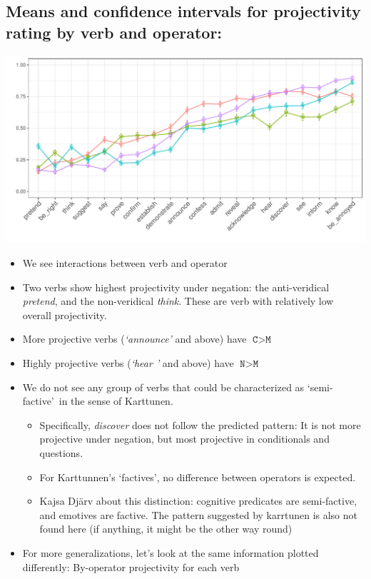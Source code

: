 \documentclass[10pt]{article}\usepackage[]{graphicx}\usepackage[dvipsnames]{xcolor}
\newenvironment{knitrout}{}{} %
\begin{document}
\subsection{Means and confidence intervals for projectivity rating by verb and operator:}
\begin{knitrout}
\color{fgcolor}

{\centering \includegraphics[width=\linewidth]{figures/summary-combined-2-1} 

}


\end{knitrout}
\begin{itemize}
  \item We see interactions between verb and operator

  \item Two verbs show highest projectivity under negation: the anti-veridical \emph{pretend}, and the non-veridical \emph{think}. These are verb with relatively low overall projectivity.

  \item More projective verbs (\emph{\lq announce\rq} and above) have $\texttt{C} > \texttt{M}$

  \item Highly projective verbs (\emph{\lq hear \rq} and above) have  $\texttt{N} > \texttt{M}$

  \item We do not see any group of verbs that could be characterized as \lq semi-factive\rq\ in the sense of Karttunen.
  \begin{itemize}
    \item Specifically, \emph{discover} does not follow the predicted pattern: It is not more projective under negation, but most projective in conditionals and questions.
    \item For Karttunnen's \lq factives\rq, no difference between operators is expected.
    \item Kajsa Djärv about this distinction: cognitive predicates are semi-factive, and emotives are factive. The pattern suggested by karrtunen is also not found here (if anything, it might be the other way round)
  \end{itemize}

  \item For more generalizations, let's look at the same information plotted differently: By-operator projectivity for each verb
\end{itemize}
\end{document}
